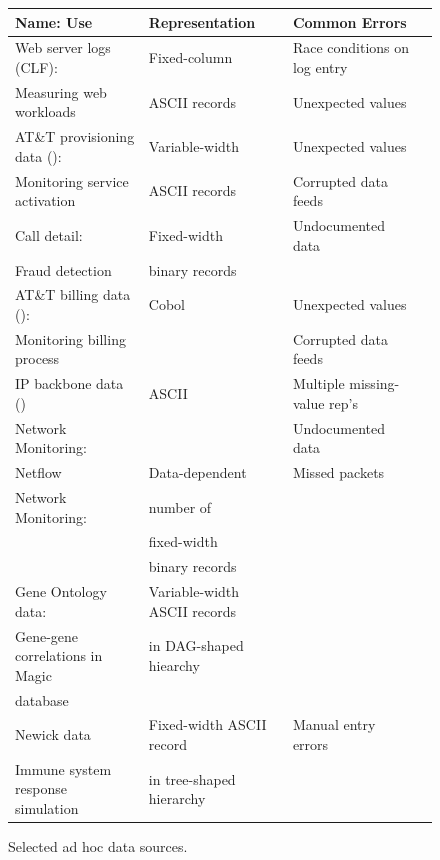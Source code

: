 \begin{figure}
\begin{center}
\begin{tabular}{@{}|l|l|l|l|}
\hline
Name: Use                           & Representation    
           & Common Errors \\ \hline\hline
Web server logs (CLF):                & Fixed-column      
& Race conditions on log entry\\ 
Measuring web workloads               & ASCII records     
& Unexpected values\\ \hline
AT\&T provisioning data (\dibbler{}): & Variable-width    
& Unexpected values \\ 
Monitoring service activation         & ASCII records     
& Corrupted data feeds \\ \hline
Call detail:                   & Fixed-width       
&  Undocumented data\\
Fraud detection 
                                      & binary records  
& \\ \hline 
AT\&T billing data (\ningaui{}):      & Cobol  
& Unexpected values\\ 
Monitoring billing process   &                             
& Corrupted data feeds \\ \hline
IP backbone data (\darkstar{})  & ASCII  
& Multiple missing-value rep's \\
Network Monitoring:  &        
& Undocumented data \\ \hline
Netflow                               & Data-dependent      
& Missed packets\\ 
Network Monitoring:        & number of   
& \\
                                      & fixed-width 
& \\
                                      & binary records 
& \\ \hline
Gene Ontology data:        & Variable-width ASCII records 
&  \\
Gene-gene correlations in Magic & in DAG-shaped hiearchy 
& \\
database &
& \\\hline
Newick data                          & Fixed-width ASCII record 
& Manual entry errors \\
Immune system response simulation & in tree-shaped hierarchy 
& \\
\hline
\end{tabular}
\caption{Selected ad hoc data sources.}
\label{figure:data-sources}
\end{center}
\end{figure}


